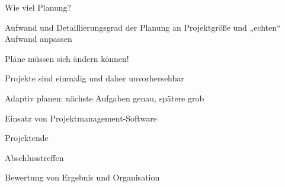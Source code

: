 \documentclass[a4paper]{article}
\begin{document}
\begin{multicols}{3}
  Wie viel Planung?
  \begin{itemize*}
    \item Aufwand und Detaillierungsgrad der Planung an Projektgröße und „echten“ Aufwand anpassen
    \item Pläne müssen sich ändern können!
    \item Projekte sind einmalig und daher unvorhersehbar
    \item Adaptiv planen: nächste Aufgaben genau, spätere grob
    \item Einsatz von Projektmanagement-Software
    \item Projektende
    \begin{itemize*}
      \item Abschlusstreffen
      \item Bewertung von Ergebnis und Organisation
    \end{itemize*}
  \end{itemize*}

\end{multicols}
\end{document}
